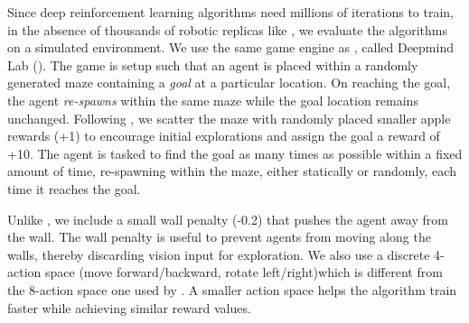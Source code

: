 Since deep reinforcement learning algorithms need millions of iterations to train, in the absence of thousands of robotic replicas like \cite{LePaKrISER2017}, we evaluate the algorithms on a simulated environment.
We use the same game engine as \cite{MiPaViICLR2017}, called Deepmind Lab (\cite{BeLeTeARXIV2016}).
The game is setup such that an agent is placed within a randomly generated maze containing a \emph{goal} at a particular location.
On reaching the goal, the agent \emph{re-spawns} within the same maze while the goal location remains unchanged. 
Following \cite{MiPaViICLR2017}, we scatter the maze with randomly placed smaller apple rewards (+1) to encourage initial explorations and assign the goal a reward of +10.
The agent is tasked to find the goal as many times as possible within a fixed amount of time, re-spawning within the maze, either statically or randomly, each time it reaches the goal.

Unlike \cite{MiPaViICLR2017}, we include a small wall penalty (-0.2) that pushes the agent away from the wall.
The wall penalty is useful to prevent agents from moving along the walls, thereby discarding vision input for exploration.
We also use a discrete 4-action space (move forward/backward, rotate left/right)which is different from the 8-action space one used by \cite{MiPaViICLR2017}.
A smaller action space helps the algorithm train faster while achieving similar reward values.

